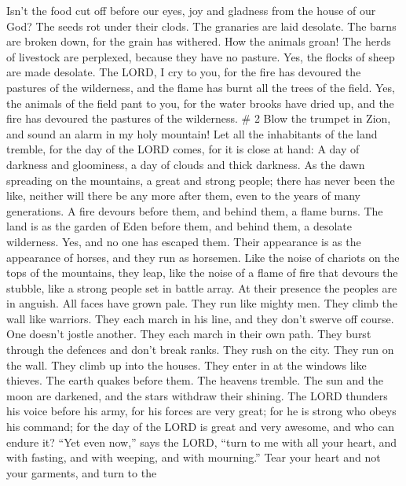 Isn't the food cut off before our eyes, joy and gladness from the house
of our God?  The seeds rot under their clods. The granaries
are laid desolate. The barns are broken down, for the grain has
withered.  How the animals groan! The herds of livestock
are perplexed, because they have no pasture. Yes, the flocks of sheep
are made desolate.  The LORD, I cry to you, for the fire
has devoured the pastures of the wilderness, and the flame has burnt all
the trees of the field.  Yes, the animals of the field pant
to you, for the water brooks have dried up, and the fire has devoured
the pastures of the wilderness. \# 2  Blow the trumpet in
Zion, and sound an alarm in my holy mountain! Let all the inhabitants of
the land tremble, for the day of the LORD comes, for it is close at
hand:  A day of darkness and gloominess, a day of clouds and
thick darkness. As the dawn spreading on the mountains, a great and
strong people; there has never been the like, neither will there be any
more after them, even to the years of many generations.  A
fire devours before them, and behind them, a flame burns. The land is as
the garden of Eden before them, and behind them, a desolate wilderness.
Yes, and no one has escaped them.  Their appearance is as
the appearance of horses, and they run as horsemen.  Like
the noise of chariots on the tops of the mountains, they leap, like the
noise of a flame of fire that devours the stubble, like a strong people
set in battle array.  At their presence the peoples are in
anguish. All faces have grown pale.  They run like mighty
men. They climb the wall like warriors. They each march in his line, and
they don't swerve off course.  One doesn't jostle another.
They each march in their own path. They burst through the defences and
don't break ranks.  They rush on the city. They run on the
wall. They climb up into the houses. They enter in at the windows like
thieves.  The earth quakes before them. The heavens
tremble. The sun and the moon are darkened, and the stars withdraw their
shining.  The LORD thunders his voice before his army, for
his forces are very great; for he is strong who obeys his command; for
the day of the LORD is great and very awesome, and who can endure it?
 ``Yet even now,'' says the LORD, ``turn to me with all
your heart, and with fasting, and with weeping, and with mourning.''
 Tear your heart and not your garments, and turn to the
